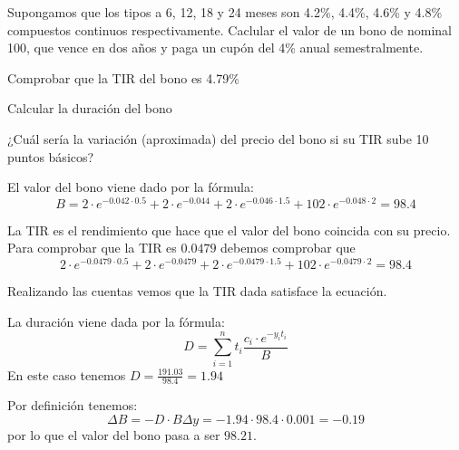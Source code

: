 \begin{problem}[2]
Supongamos que los tipos a 6, 12, 18 y 24 meses son 4.2\%, 4.4\%, 4.6\% y 4.8\% compuestos continuos respectivamente.
\spart Caclular el valor de un bono de nominal 100, que vence en dos años y paga un cupón del 4\% anual semestralmente.

\ppart Comprobar que la TIR del bono es 4.79\%

\ppart Calcular la duración del bono

\ppart ¿Cuál sería la variación (aproximada) del precio del bono si su TIR sube 10 puntos básicos?

\solution


\spart
El valor del bono viene dado por la fórmula:
\[B = 2\cdot e^{-0.042\cdot 0.5} + 2 \cdot e^{-0.044} + 2\cdot e^{-0.046 \cdot 1.5} + 102 \cdot e^{-0.048 \cdot 2} = 98.4\]

\spart
La TIR es el rendimiento que hace que el valor del bono coincida con su precio. Para comprobar que la TIR es $0.0479$ debemos comprobar que
\[2\cdot e^{-0.0479\cdot 0.5} + 2 \cdot e^{-0.0479} + 2\cdot e^{-0.0479 \cdot 1.5} + 102 \cdot e^{-0.0479 \cdot 2} = 98.4\]

Realizando las cuentas vemos que la TIR dada satisface la ecuación.

\spart
La duración viene dada por la fórmula:
\[D = \sum_{i=1}^n t_i \frac{c_i\cdot e^{-y_it_i}}{B}\]
En este caso tenemos $D=\frac{191.03}{98.4} = 1.94$

\spart
Por definición tenemos:
\[ΔB = -D\cdot B Δy = -1.94 \cdot 98.4 \cdot 0.001 = -0.19\]
por lo que el valor del bono pasa a ser $98.21$.
\end{problem}